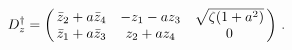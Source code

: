 \begin{equation}
 D_z^{\dagger} = 
\left( \begin{array}{@{\,}ccc@{\,}}
   \bar{z}_2+a\bar{z}_4 & -z_1-az_3  &  \sqrt{\zeta (1+a^2)} \\
   \bar{z}_1+a\bar{z}_3  & z_2+az_4  &  0 
  \end{array}  \right)\,.\label{eq:4.1.2}
\end{equation}

